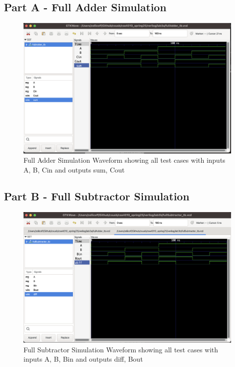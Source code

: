 \documentclass[a4paper,12pt]{article}
\begin{document}
\subsection*{Part A - Full Adder Simulation}
\begin{figure}[h]
    \centering
    \includegraphics[width=\textwidth]{full_adder.png}
    \caption{Full Adder Simulation Waveform showing all test cases with inputs A, B, Cin and outputs sum, Cout}
\end{figure}

\subsection*{Part B - Full Subtractor Simulation}
\begin{figure}[h]
    \centering
    \includegraphics[width=\textwidth]{full_subtractor.png}
    \caption{Full Subtractor Simulation Waveform showing all test cases with inputs A, B, Bin and outputs diff, Bout}
\end{figure}
\end{document}
